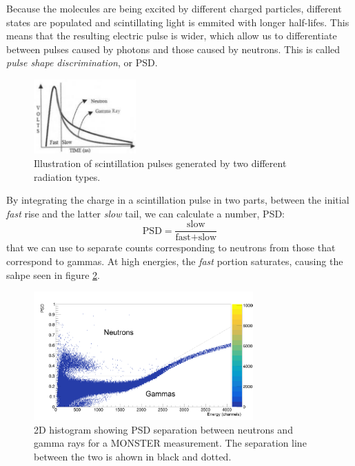 \documentclass[a4paper,12pt]{report}
\begin{document}
Because the molecules are being excited by different charged particles, different states are populated and scintillating light is emmited with longer half-lifes.
This means that the resulting electric pulse is wider, which allow us to differentiate between pulses caused by photons and those caused by neutrons.
This is called \textit{pulse shape discrimination}, or PSD.

\begin{figure}[H]
	\centering
	\includegraphics[width=0.35\textwidth]{psd_explanation.png}
	\caption{Illustration of scintillation pulses generated by two different radiation types.}	%
	\label{psd_explanation}
\end{figure}

By integrating the charge in a scintillation pulse in two parts, between the initial \textit{fast} rise and the latter \textit{slow} tail, we can calculate a number, PSD:
\begin{equation}
	\text{PSD} = \frac{\text{slow}}{\text{fast}+\text{slow}}	%
\end{equation}
that we can use to separate counts corresponding to neutrons from those that correspond to gammas.
At high energies, the \textit{fast} portion saturates, causing the sahpe seen in figure \ref{example_psd}.

\begin{figure}[H]
	\centering
	\includegraphics[width=0.75\textwidth]{example_psd.png}
	\caption{2D histogram showing PSD separation between neutrons and gamma rays for a MONSTER measurement.
	The separation line between the two is ahown in black and dotted.}
	\label{example_psd}
\end{figure}
\end{document}
